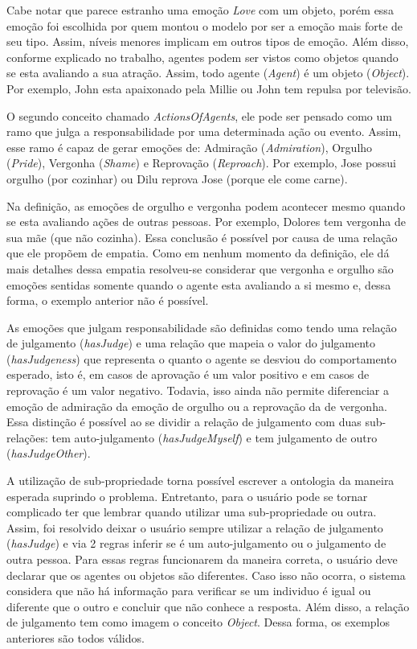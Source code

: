Cabe notar que parece estranho uma emoção \emph{Love} com um objeto, porém
essa emoção foi escolhida por quem montou o modelo por ser a emoção mais forte
de seu tipo. Assim, níveis menores implicam em outros tipos de emoção. Além
disso, conforme explicado no trabalho, agentes podem ser vistos como objetos
quando se esta avaliando a sua atração. Assim, todo agente (\emph{Agent}) é um
objeto (\emph{Object}). Por exemplo, John esta apaixonado pela Millie ou
John tem repulsa por televisão.

O segundo conceito chamado \emph{ActionsOfAgents}, ele pode ser pensado como
um ramo que julga a responsabilidade por uma determinada ação ou evento.
Assim, esse ramo é capaz de gerar emoções de: Admiração (\emph{Admiration}),
Orgulho (\emph{Pride}), Vergonha (\emph{Shame}) e Reprovação
(\emph{Reproach}). Por exemplo, Jose possui orgulho (por cozinhar) ou Dilu
reprova Jose (porque ele come carne).

Na definição, as emoções de orgulho e vergonha podem acontecer mesmo quando se
esta avaliando ações de outras pessoas. Por exemplo, Dolores tem vergonha de
sua mãe (que não cozinha). Essa conclusão é possível por causa de uma relação
que ele propõem de empatia. Como em nenhum momento da definição, ele dá mais
detalhes dessa empatia resolveu-se considerar que vergonha e orgulho são
emoções sentidas somente quando o agente esta avaliando a si mesmo e, dessa
forma, o exemplo anterior não é possível.

As emoções que julgam responsabilidade são definidas como tendo uma relação de
julgamento (\emph{hasJudge}) e uma relação que mapeia o valor do julgamento
(\emph{hasJudgeness}) que representa o quanto o agente se desviou do
comportamento esperado, isto é, em casos de aprovação é um valor positivo e em
casos de reprovação é um valor negativo. Todavia, isso ainda não permite
diferenciar a emoção de admiração da emoção de orgulho ou a reprovação da de
vergonha. Essa distinção é possível ao se dividir a relação de julgamento com
duas sub-relações: tem auto-julgamento (\emph{hasJudgeMyself}) e tem
julgamento de outro (\emph{hasJudgeOther}).

A utilização de sub-propriedade torna possível escrever a ontologia da maneira
esperada suprindo o problema. Entretanto, para o usuário pode se tornar
complicado ter que lembrar quando utilizar uma sub-propriedade ou outra.
Assim, foi resolvido deixar o usuário sempre utilizar a relação de julgamento
(\emph{hasJudge}) e via 2 regras inferir se é um auto-julgamento ou o
julgamento de outra pessoa. Para essas regras funcionarem da maneira correta,
o usuário deve declarar que os agentes ou objetos são diferentes. Caso isso
não ocorra, o sistema considera que não há informação para verificar se um
individuo é igual ou diferente que o outro e concluir que não conhece a
resposta. Além disso, a relação de julgamento tem como imagem o conceito
\emph{Object}. Dessa forma, os exemplos anteriores são todos válidos.

